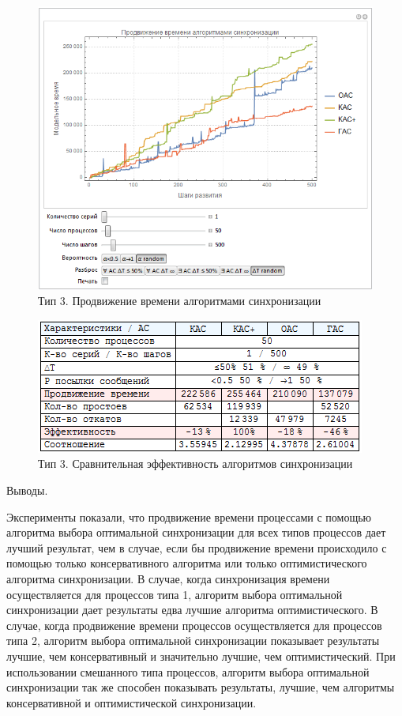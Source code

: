 \begin{enumerate}
\begin{figure}[H]
\centering
\includegraphics[scale=1]{графика/typeAB.png}
\caption{Тип 3. Продвижение времени алгоритмами синхронизации}
\end{figure}

\begin{figure}[H]
\centering
\includegraphics[scale=1]{графика/tableAB.png}
\caption{Тип 3. Сравнительная эффективность алгоритмов синхронизации}
\end{figure}

\end{enumerate}


Выводы.

Эксперименты показали, что продвижение времени процессами с помощью алгоритма выбора оптимальной синхронизации для всех типов процессов дает лучший результат, чем в случае, если бы продвижение времени происходило с помощью только консервативного алгоритма или только оптимистического алгоритма синхронизации. В случае, когда синхронизация времени осуществляется для процессов типа 1, алгоритм выбора оптимальной синхронизации дает результаты едва лучшие алгоритма оптимистического. В случае, когда продвижение времени процессов осуществляется для процессов типа 2, алгоритм выбора оптимальной синхронизации показывает результаты лучшие, чем консервативный и значительно лучшие, чем оптимистический. При использовании смешанного типа процессов, алгоритм выбора оптимальной синхронизации так же способен показывать результаты, лучшие, чем алгоритмы консервативной и оптимистической синхронизации. 











